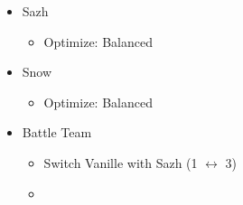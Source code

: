 \begin{menu}
\begin{itemize}
\begin{itemize}
\begin{itemize}
				      \end{itemize}
				\item Sazh
				      \begin{itemize}
					      \item Optimize: Balanced
				      \end{itemize}
				\item Snow
				      \begin{itemize}
					      \item Optimize: Balanced
				      \end{itemize}
			\end{itemize}
			\paradigm
			\begin{itemize}
				\item Battle Team
				      \begin{itemize}
					      \item Switch Vanille with Sazh (1 $\leftrightarrow$ 3)
					      \item {}%
					            {\paradigmline{\com}{\com}{\med}}%
					            {\paradigmline[2]{\textit{\com}}{\textit{\com}}{\textit{(\rav)}}}%
					            {\paradigmline{(\sen)}{\sen}{(\med)}}%
					            {\paradigmline{\syn}{\rav}{\rav}}%
					            {\paradigmline{\rav}{\rav}{\sab}}%
					            {\paradigmline{\rav}{\rav}{\rav}}
				      \end{itemize}
			\end{itemize}
		\end{itemize}

	\end{menu}
	\renewcommand{\first}{[1] Tireless Charge ((\com)/\com/\med)}
	\renewcommand{\second}{[2] Aggression (\com/\com/\rav)}
	\renewcommand{\third}{[3] Consolidation (\sen/\sen/\med)}
	\renewcommand{\fourth}{[4] Malevolence (\syn/(\rav)/\rav)}
	\renewcommand{\fifth}{[5] Smart Bomb (\rav/\rav/\sab)}
	\renewcommand{\sixth}{[6] Tri-Disaster (\rav/\rav/\rav)}
